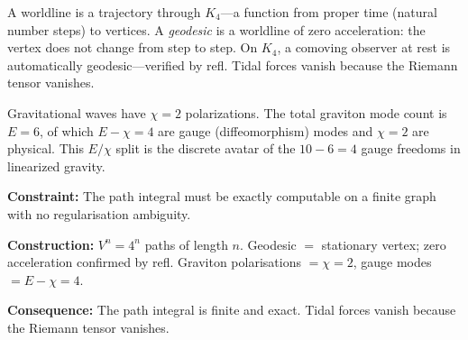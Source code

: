 \documentclass[11pt,a4paper]{book}
\def\texttt#1{#1}%
\newcommand{\VoidRef}[2]{\textit{#2} (in \textit{Void})}
\begin{document}
A worldline is a trajectory through $K_4$---a function from proper time (natural number steps) to vertices. A \emph{geodesic} is a worldline of zero acceleration: the vertex does not change from step to step. On $K_4$, a comoving observer at rest is automatically geodesic---verified by \texttt{refl}. Tidal forces vanish because the Riemann tensor vanishes.

Gravitational waves have $\chi = 2$ polarizations. The total graviton mode count is $E = 6$, of which $E - \chi = 4$ are gauge (diffeomorphism) modes and $\chi = 2$ are physical. This $E/\chi$ split is the discrete avatar of the $10 - 6 = 4$ gauge freedoms in linearized gravity.


\textbf{Constraint:} The path integral must be exactly computable on a finite graph with no regularisation ambiguity.

\textbf{Construction:} $V^n = 4^n$ paths of length $n$. Geodesic $=$ stationary vertex; zero acceleration confirmed by \texttt{refl}. Graviton polarisations $= \chi = 2$, gauge modes $= E - \chi = 4$.

\textbf{Consequence:} The path integral is finite and exact. Tidal forces vanish because the Riemann tensor vanishes.
\end{document}
